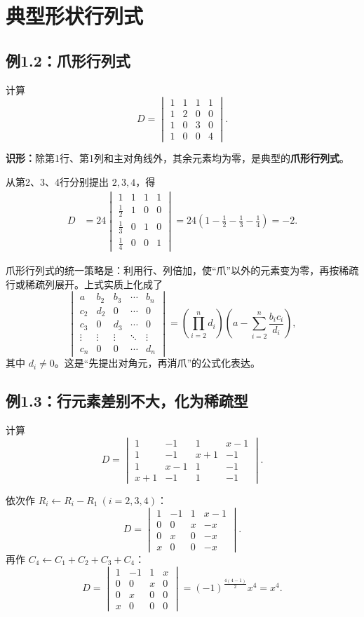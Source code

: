\documentclass[UTF8,zihao=5,fontset=mac]{ctexart}
\newcommand{\key}[1]{\textcolor{warm}{\bfseries #1}}
\newcommand{\dmat}[1]{\begin{vmatrix}#1\end{vmatrix}}
\begin{document}
\section{典型形状行列式}

\subsection{例1.2：爪形行列式}
\begin{problembox}[题目]
计算
\[
D=\dmat{1&1&1&1\\1&2&0&0\\1&0&3&0\\1&0&0&4}.
\]
\end{problembox}

\textbf{识形：}除第1行、第1列和主对角线外，其余元素均为零，是典型的\key{爪形行列式}。

从第2、3、4行分别提出 $2,3,4$，得
\begin{align*}
D
&=24\dmat{1&1&1&1\\\frac12&1&0&0\\\frac13&0&1&0\\\frac14&0&0&1} =24\left(1-\frac12-\frac13-\frac14\right)=-2.
\end{align*}

\begin{summarybox}[分析与方法总结]
爪形行列式的统一策略是：利用行、列倍加，使“爪”以外的元素变为零，再按稀疏行或稀疏列展开。上式实质上化成了
\[
\dmat{a&b_2&b_3&\cdots&b_n\\c_2&d_2&0&\cdots&0\\c_3&0&d_3&\cdots&0\\\vdots&\vdots&\vdots&\ddots&\vdots\\c_n&0&0&\cdots&d_n}
=\left(\prod_{i=2}^n d_i\right)
\left(a-\sum_{i=2}^n\frac{b_i c_i}{d_i}\right),
\]
其中 $d_i\ne0$。这是“先提出对角元，再消爪”的公式化表达。
\end{summarybox}

\subsection{例1.3：行元素差别不大，化为稀疏型}
\begin{problembox}[题目]
计算
\[
D=\dmat{
1&-1&1&x-1\\
1&-1&x+1&-1\\
1&x-1&1&-1\\
x+1&-1&1&-1}.
\]
\end{problembox}

依次作 $R_i\leftarrow R_i-R_1\ (i=2,3,4)$：
\[
D=\dmat{1&-1&1&x-1\\0&0&x&-x\\0&x&0&-x\\x&0&0&-x}.
\]
再作 $C_4\leftarrow C_1+C_2+C_3+C_4$：
\[
D=\dmat{1&-1&1&x\\0&0&x&0\\0&x&0&0\\x&0&0&0}
=(-1)^{\frac{4(4-1)}2}x^4=x^4.
\]
\end{document}
